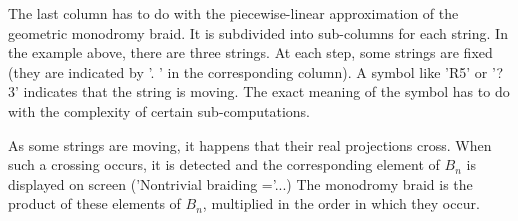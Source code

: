 The last column has to do with the piecewise-linear approximation of the
geometric monodromy  braid. It is  subdivided into sub-columns  for each
string. In  the example above,  there are  three strings. At  each step,
some strings are fixed (they are  indicated by '. ' in the corresponding
column). A symbol like 'R5' or '?3' indicates that the string is moving.
The exact meaning of the symbol has to do with the complexity of certain
sub-computations.

As  some strings  are moving,  it  happens that  their real  projections
cross. When such a crossing occurs, it is detected and the corresponding
element of $B_n$ is displayed on screen ('Nontrivial braiding ='...) The
monodromy braid is the product of these elements of $B_n$, multiplied in
the order in which they occur.

